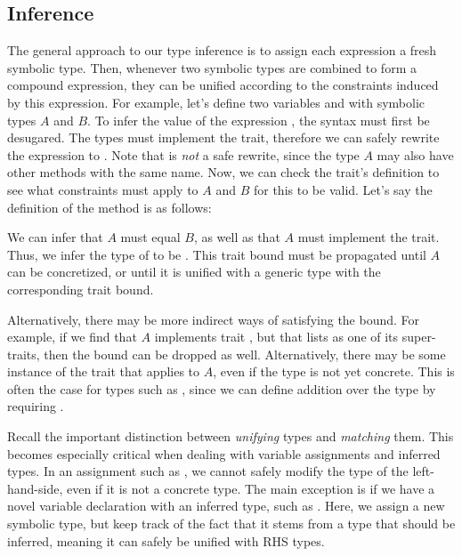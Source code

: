 \subsection{Inference}
The general approach to our type inference is to assign each expression a fresh symbolic type. Then, whenever two symbolic types are combined to form a compound expression, they can be unified according to the constraints induced by this expression. For example, let's define two variables  and  with symbolic types $A$ and $B$. To infer the value of the expression , the syntax must first be desugared. The types must implement the  trait, therefore we can safely rewrite the expression to . Note that  is \textit{not} a safe rewrite, since the type $A$ may also have other methods with the same name. Now, we can check the trait's definition to see what constraints must apply to $A$ and $B$ for this to be valid. Let's say the definition of the method is as follows:
\par
{}
\par
We can infer that $A$ must equal $B$, as well as that $A$ must implement the  trait. Thus, we infer the type of  to be . This trait bound must be propagated until $A$ can be concretized, or until it is unified with a generic type with the corresponding trait bound.
\par
Alternatively, there may be more indirect ways of satisfying the bound. For example, if we find that $A$ implements trait , but that  lists  as one of its super-traits, then the bound can be dropped as well. Alternatively, there may be some instance of the  trait that applies to $A$, even if the type is not yet concrete. This is often the case for types such as , since we can define addition over the  type by requiring .
\par
Recall the important distinction between \textit{unifying} types and \textit{matching} them. This becomes especially critical when dealing with variable assignments and inferred types. In an assignment such as , we cannot safely modify the type of the left-hand-side, even if it is not a concrete type. The main exception is if we have a novel variable declaration with an inferred type, such as . Here, we assign  a new symbolic type, but keep track of the fact that it stems from a type that should be inferred, meaning it can safely be unified with RHS types.

